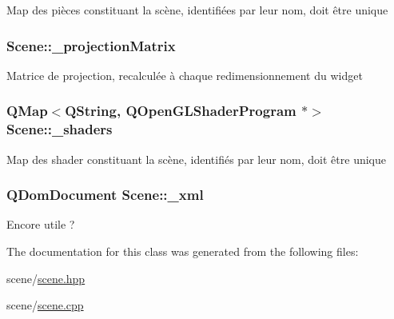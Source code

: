 Map des pièces constituant la scène, identifiées par leur nom, doit être unique \hypertarget{class_scene_a7db3394191c0a07e6bdc456a53ac8ece}{
\subsubsection[{\+\_\+projection\+Matrix}]{ Scene\+::\+\_\+projection\+Matrix\hspace{0.3cm}{\ttfamily [private]}}}\label{class_scene_a7db3394191c0a07e6bdc456a53ac8ece}
Matrice de projection, recalculée à chaque redimensionnement du widget \hypertarget{class_scene_abde34dc03c8d3a07b3177041ab195f07}{
\subsubsection[{\+\_\+shaders}]{\setlength{\rightskip}{0pt plus 5cm}Q\+Map$<$Q\+String, Q\+Open\+G\+L\+Shader\+Program $\ast$$>$ Scene\+::\+\_\+shaders\hspace{0.3cm}{\ttfamily [private]}}}\label{class_scene_abde34dc03c8d3a07b3177041ab195f07}
Map des shader constituant la scène, identifiés par leur nom, doit être unique \hypertarget{class_scene_a72a13a904d01e99834ba24ca655b9813}{
\subsubsection[{\+\_\+xml}]{\setlength{\rightskip}{0pt plus 5cm}Q\+Dom\+Document Scene\+::\+\_\+xml\hspace{0.3cm}{\ttfamily [private]}}}\label{class_scene_a72a13a904d01e99834ba24ca655b9813}
Encore utile ? 

The documentation for this class was generated from the following files\+:\begin{DoxyCompactItemize}
\item 
scene/\hyperlink{scene_8hpp}{scene.\+hpp}\item 
scene/\hyperlink{scene_8cpp}{scene.\+cpp}\end{DoxyCompactItemize}
